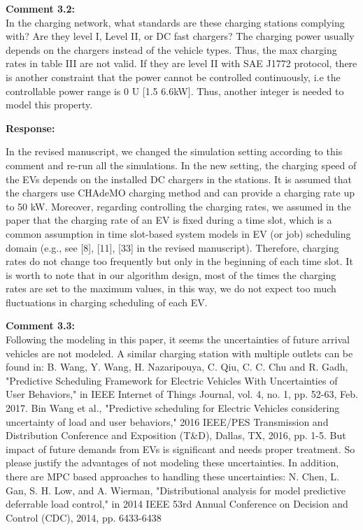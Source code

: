 \documentclass[11pt]{article}
\begin{document}
\vspace{5mm}
{
{\color{blue}\noindent\textbf{Comment 3.2:}\\
In the charging network, what standards are these charging stations complying with? Are they level I, Level II, or DC fast chargers? The charging power usually depends on the chargers instead of the vehicle types. Thus, the max charging rates in table III are not valid. If they are level II with SAE J1772 protocol, there is another constraint that the power cannot be controlled continuously, i.e the controllable power range is {0} U [1.5 6.6kW]. Thus, another integer is needed to model this property.
}}

\vspace{5mm}
\noindent\textbf{Response:}

In the revised manuscript, we changed the simulation setting according to this comment and re-run all the simulations. In the new setting, the charging speed of the EVs depends on the installed DC chargers in the stations. It is assumed that the chargers use CHAdeMO charging method and can provide a charging rate up to 50 kW. Moreover, regarding controlling the charging rates, we assumed in the paper that the charging rate of an EV is fixed during a time slot, which is a common assumption in time slot-based system models in EV (or job) scheduling domain (e.g., see [8], [11], [33] in the revised manuscript).  Therefore, charging rates do not change too frequently but only in the beginning of each time slot. It is worth to note that in our algorithm design, most of the times the charging rates are set to the maximum values, in this way, we do not expect too much fluctuations in charging scheduling of each EV.



\vspace{5mm}
{
{\color{blue}\noindent\textbf{Comment 3.3:}\\
 Following the modeling in this paper, it seems the uncertainties of future arrival vehicles are not modeled. A similar charging station with multiple outlets can be found in:
B. Wang, Y. Wang, H. Nazaripouya, C. Qiu, C. C. Chu and R. Gadh, "Predictive Scheduling Framework for Electric Vehicles With Uncertainties of User Behaviors," in IEEE Internet of Things Journal, vol. 4, no. 1, pp. 52-63, Feb. 2017.
Bin Wang et al., "Predictive scheduling for Electric Vehicles considering uncertainty of load and user behaviors," 2016 IEEE/PES Transmission and Distribution Conference and Exposition (T\&D), Dallas, TX, 2016, pp. 1-5.
But impact of future demands from EVs is significant and needs proper treatment. So please justify the advantages of not modeling these uncertainties. In addition, there are MPC based approaches to handling these uncertainties:
N. Chen, L. Gan, S. H. Low, and A. Wierman, "Distributional analysis for model predictive deferrable load control," in 2014 IEEE 53rd Annual Conference on Decision and Control (CDC), 2014, pp. 6433-6438
}}
\end{document}
